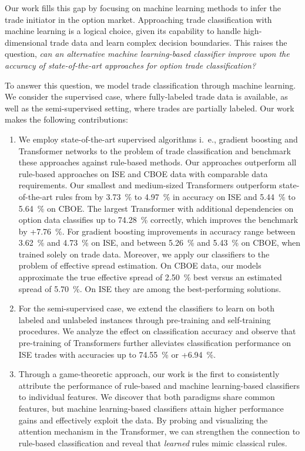 Our work fills this gap by focusing on machine learning methods to infer the trade initiator in the option market. Approaching trade classification with machine learning is a logical choice, given its capability to handle high-dimensional trade data and learn complex decision boundaries. This raises the question, \emph{can an alternative machine learning-based classifier improve upon the accuracy of state-of-the-art approaches for option trade classification?}

To answer this question, we model trade classification through machine learning. We consider the supervised case, where fully-labeled trade data is available, as well as the semi-supervised setting, where trades are partially labeled. Our work makes the following contributions:
\begin{enumerate}[label=(\roman*),noitemsep]
    \item We employ state-of-the-art supervised algorithms i.~e., gradient boosting and Transformer networks to the problem of trade classification and benchmark these approaches against rule-based methods. Our approaches outperform all rule-based approaches on \gls{ISE} and \gls{CBOE} data with comparable data requirements. Our smallest and medium-sized Transformers outperform state-of-the-art rules from \textcite[][13--15]{grauerOptionTradeClassification2022} by \SI{3.73}{\percent} to \SI{4.97}{\percent} in accuracy on \gls{ISE} and \SI{5.44}{\percent} to \SI{5.64}{\percent} on \gls{CBOE}. The largest Transformer with additional dependencies on option data classifies up to \SI{74.28}{\percent} correctly, which improves the benchmark by +\SI{7.76}{\percent}. For gradient boosting improvements in accuracy range between \SI{3.62}{\percent} and \SI{4.73}{\percent} on \gls{ISE}, and between \SI{5.26}{\percent} and \SI{5.43}{\percent} on \gls{CBOE}, when trained solely on trade data. Moreover, we apply our classifiers to the problem of effective spread estimation. On \gls{CBOE} data, our models approximate the true effective spread of \SI{2.50}{\percent} best versus an estimated spread of \SI{5.70}{\percent}. On \gls{ISE} they are among the best-performing solutions.
    \item For the semi-supervised case, we extend the classifiers to learn on both labeled and unlabeled instances through pre-training and self-training procedures. We analyze the effect on classification accuracy and observe that pre-training of Transformers further alleviates classification performance on \gls{ISE} trades with accuracies up to \SI{74.55}{\percent} or +\SI{6.94}{\percent}.
    \item Through a game-theoretic approach, our work is the first to consistently attribute the performance of rule-based and machine learning-based classifiers to individual features. We discover that both paradigms share common features, but machine learning-based classifiers attain higher performance gains and effectively exploit the data. By probing and visualizing the attention mechanism in the Transformer, we can strengthen the connection to rule-based classification and reveal that \emph{learned} rules mimic classical rules.
\end{enumerate}

